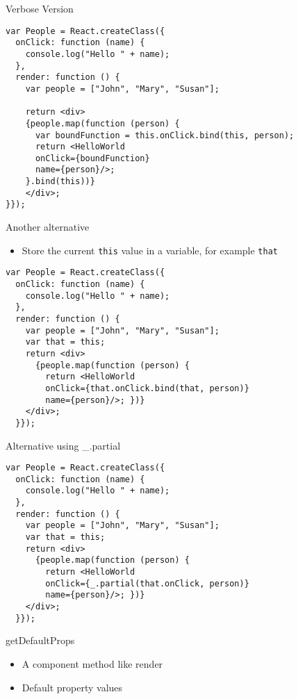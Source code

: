 \documentclass[presentation]{beamer}
\begin{document}
\begin{frame}[fragile,label=sec-16]{Verbose Version}
 \begin{verbatim}
var People = React.createClass({
  onClick: function (name) {
    console.log("Hello " + name);
  },
  render: function () {
    var people = ["John", "Mary", "Susan"];

    return <div>
    {people.map(function (person) {
      var boundFunction = this.onClick.bind(this, person);
      return <HelloWorld
      onClick={boundFunction}
      name={person}/>;
    }.bind(this))}
    </div>;
}});
\end{verbatim}
\end{frame}

\begin{frame}[fragile,label=sec-17]{Another alternative}
 \begin{itemize}
\item Store the current \texttt{this} value in a variable, for example \texttt{that}
\end{itemize}

\begin{verbatim}
var People = React.createClass({
  onClick: function (name) {
    console.log("Hello " + name);
  },
  render: function () {
    var people = ["John", "Mary", "Susan"];
    var that = this;
    return <div>
      {people.map(function (person) {
        return <HelloWorld
        onClick={that.onClick.bind(that, person)}
        name={person}/>; })}
    </div>;
  }});
\end{verbatim}
\end{frame}


\begin{frame}[fragile,label=sec-18]{Alternative using \_.partial}
 \begin{verbatim}
var People = React.createClass({
  onClick: function (name) {
    console.log("Hello " + name);
  },
  render: function () {
    var people = ["John", "Mary", "Susan"];
    var that = this;
    return <div>
      {people.map(function (person) {
        return <HelloWorld
        onClick={_.partial(that.onClick, person)}
        name={person}/>; })}
    </div>;
  }});
\end{verbatim}
\end{frame}

\begin{frame}[label=sec-19]{getDefaultProps}
\begin{itemize}
\item A component method like render
\item Default property values
\end{itemize}
\end{frame}
\end{document}
